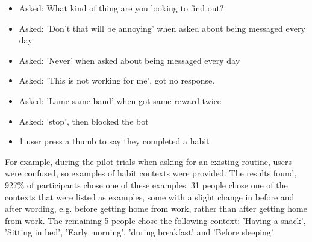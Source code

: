 \documentclass{scaffold/sigchi}
\begin{document}
\begin{itemize}
  \item Asked: What kind of thing are you looking to find out?
  \item Asked: 'Don't that will be annoying' when asked about being messaged every day
  \item Asked: 'Never' when asked about being messaged every day
  \item Asked: 'This is not working for me', got no response.
  \item Asked: 'Lame same band' when got same reward twice
  \item Asked: 'stop', then blocked the bot
  \item 1 user press a thumb to say they completed a habit
\end{itemize}

For example, during the pilot trials when asking for an existing routine, users were confused, so examples of habit contexts were provided. The results found, 92?\% of participants chose one of these examples.
31 people chose one of the contexts that were listed as examples, some with a slight change in before and after wording, e.g. before getting home from work, rather than after getting home from work. The remaining 5 people chose the following context: 'Having a snack', 'Sitting in bed', 'Early morning', 'during breakfast' and 'Before sleeping'.







\end{document}
